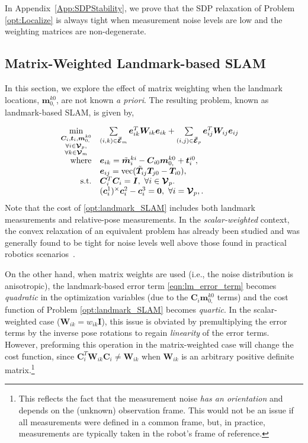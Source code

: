\documentclass[lettersize,journal]{IEEEtran}
\newcommand{\EdgeSet}{\vec{\bm{\mathcal{E}}}}
\newcommand{\VertSetP}{\bm{\mathcal{V}}_p}
\newcommand{\VertSetM}{\bm{\mathcal{V}}_m}
\newcommand{\vect}[1]{\mbox{vec}(#1)}
\begin{document}
In Appendix~\ref{App:SDPStability}, we prove that the SDP relaxation of Problem \eqref{opt:Localize} is always tight when measurement noise levels are low and the weighting matrices are non-degenerate.

\subsection{Matrix-Weighted Landmark-based SLAM}\label{sec:SLAM}

In this section, we explore the effect of matrix weighting when the landmark locations, $\bm{m}_{0,}^{k0}$, are not known \emph{a priori}. The resulting problem, known as landmark-based SLAM, is given by,

\begin{equation}
	\label{opt:landmark_SLAM}
	\hspace*{-10pt}\begin{array}{rl}
		\min\limits_{\substack{\bm{C}_i,\bm{t}_i, \bm{m}_{0,}^{k0}\\ \forall i\in \VertSetP,\\ \forall k\in\VertSetM } } &\sum\limits_{(i,k)\in\EdgeSet_m}  \bm{e}_{ik}^T \bm{W}_{ik} \bm{e}_{ik} +\sum\limits_{(i,j)\in\EdgeSet_p}  \bm{e}_{ij}^T \bm{W}_{ij} \bm{e}_{ij}\\
		\mbox{where} & \bm{e}_{ik} = \tilde{\bm{m}}_i^{ki} - \bm{C}_{i0}\bm{m}_{0,}^{k0} + \bm{t}_i^{i0} , \\
		&\bm{e}_{ij} = \vect{\tilde{\bm{T}}_{ij}\bm{T}_{j0} - \bm{T}_{i0}}, \\
		\mbox{s.t.} &\bm{C}_i^T \bm{C}_i = \bm{I},~\forall i \in \VertSetP.\\
		& (\bm{c}_i^{1})^\times\bm{c}_i^{2} - \bm{c}_i^{3} = \bm{0},~\forall i = \VertSetP,.
	\end{array}
\end{equation}
Note that the cost of \eqref{opt:landmark_SLAM} includes both landmark measurements and relative-pose measurements.
In the \emph{scalar-weighted} context, the convex relaxation of an equivalent problem has already been studied and was generally found to be tight for noise levels well above those found in practical robotics scenarios~\cite{holmesEfficientGlobalOptimality2023}. 

On the other hand, when matrix weights are used (i.e., the noise distribution is anisotropic), the landmark-based error term \eqref{eqn:lm_error_term} becomes \emph{quadratic} in the optimization variables (due to the $\bm{C}_i\bm{m}_{0,}^{k0}$ terms) and the cost function of Problem \eqref{opt:landmark_SLAM} becomes \emph{quartic}. In the scalar-weighted case ($\bm{W}_{ik} = w_{ik}\bm{I}$), this issue is obviated by premultiplying the error terms by the inverse pose rotations to regain \emph{linearity} of the error terms. However, preforming this operation in the matrix-weighted case will change the cost function, since $\bm{C}_i^T\bm{W}_{ik}\bm{C}_i\neq \bm{W}_{ik}$ when $\bm{W}_{ik}$ is an arbitrary positive definite matrix.\footnote{This reflects the fact that the measurement noise \emph{has an orientation} and depends on the (unknown) observation frame. This would not be an issue if all measurements were defined in a common frame, but, in practice, measurements are typically taken in the robot's frame of reference.}
\end{document}
